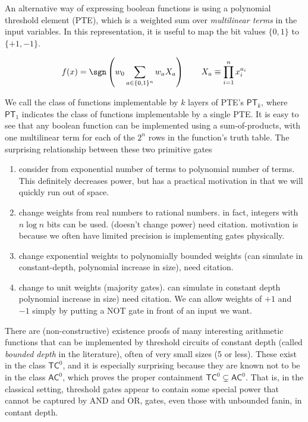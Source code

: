 An alternative way of expressing boolean functions is using a polynomial
threshold element (PTE), which is a weighted sum over \emph{multilinear terms}
in the input variables. In this representation, it is useful to
map the bit values $\{0,1\}$ to $\{+1,-1\}$.

\begin{equation}
f(x) = \sgn\left( w_0 \sum_{a \in \{0,1\}^n} w_a X_a \right) \qquad X_a \equiv \prod_{i=1}^n x_i^{a_i}
\end{equation}

We call the class of functions implementable by $k$ layers of PTE's
$\textsf{PT}_k$, where $\textsf{PT}_1$ indicates the class of functions
implementable by a single PTE.
It is easy to see that any boolean function can be implemented using
a sum-of-products, with one multilinear term for each of the $2^n$
rows in the function's truth table. The surprising relationship between
these two primitive gates 


\begin{enumerate}

\item
consider from exponential number of terms to polynomial number
of terms. This definitely decreases power, but has a practical
motivation in that we will quickly run out of space.

\item
change weights from real numbers to rational numbers. in fact,
integers with $n \log n$ bits can be used. (doesn't change power) need citation. motivation is because we often have limited precision is
implementing gates physically.

\item
change exponential weights to polynomially bounded weights (can simulate in constant-depth, polynomial increase in size), need
citation.

\item
change to unit weights (majority gates). can simulate in
constant depth polynomial increase in size) need citation.
We can allow weights of $+1$ and $-1$ simply by putting a
NOT gate in front of an input we want.

\end{enumerate}

There are (non-constructive) existence proofs of many interesting 
arithmetic functions that can be implemented by threshold circuits
of constant depth (called \emph{bounded depth} in the literature),
often of very small sizes (5 or less). These exist in the class
$\textsf{TC}^0$, and it is especially surprising because they are known
not to be in the class $\textsf{AC}^0$, which proves the proper
containment $\textsf{TC}^0 \subsetneq \textsf{AC}^0$. That is, in
the classical setting, threshold gates appear to contain some
special power that cannot be captured by AND and OR, gates, even those
with unbounded fanin, in contant depth.

